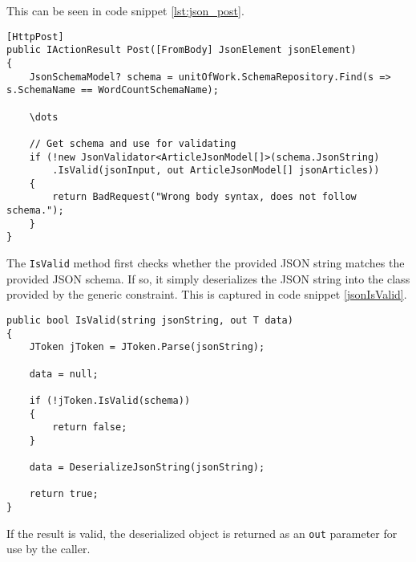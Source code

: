 This can be seen in code snippet \ref{lst:json_post}.

\begin{lstlisting}[language=CSharp, caption={Snippet from the \texttt{POST} method showing validation of the input JSON.}, label={lst:json_post}]
[HttpPost]
public IActionResult Post([FromBody] JsonElement jsonElement)
{
	JsonSchemaModel? schema = unitOfWork.SchemaRepository.Find(s => s.SchemaName == WordCountSchemaName);
	
	\dots

	// Get schema and use for validating
	if (!new JsonValidator<ArticleJsonModel[]>(schema.JsonString)
		.IsValid(jsonInput, out ArticleJsonModel[] jsonArticles))
	{
		return BadRequest("Wrong body syntax, does not follow schema.");
	}
}
\end{lstlisting}

The \texttt{IsValid} method first checks whether the provided JSON string matches the provided JSON schema.
If so, it simply deserializes the JSON string into the class provided by the generic constraint.
This is captured in code snippet \ref{jsonIsValid}.

\begin{lstlisting}[language=CSharp, caption={The \texttt{IsValid} method from the \texttt{JsonValidator} class.}, label={lst:jsonIsValid}]
public bool IsValid(string jsonString, out T data)
{
	JToken jToken = JToken.Parse(jsonString);

	data = null;

	if (!jToken.IsValid(schema))
	{
		return false;
	}

	data = DeserializeJsonString(jsonString);

	return true;
}
\end{lstlisting}

If the result is valid, the deserialized object is returned as an \texttt{out} parameter for use by the caller.
